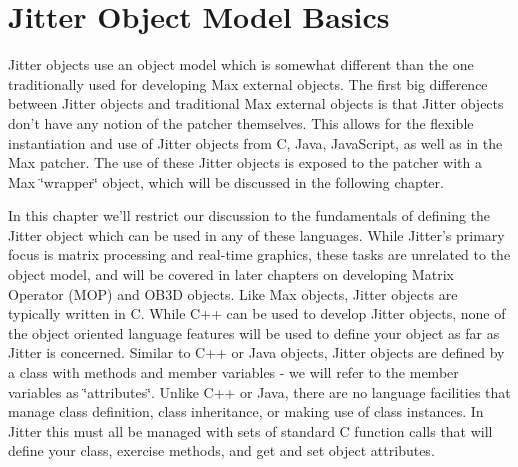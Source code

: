 \hypertarget{chapter_jit_objectmodel_chapter_jit_objectmodel_basics}{}\section{Jitter Object Model Basics}\label{chapter_jit_objectmodel_chapter_jit_objectmodel_basics}
Jitter objects use an object model which is somewhat different than the one traditionally used for developing Max external objects. The first big difference between Jitter objects and traditional Max external objects is that Jitter objects don't have any notion of the patcher themselves. This allows for the flexible instantiation and use of Jitter objects from C, Java, JavaScript, as well as in the Max patcher. The use of these Jitter objects is exposed to the patcher with a Max \char`\"{}wrapper\char`\"{} object, which will be discussed in the following chapter.

In this chapter we'll restrict our discussion to the fundamentals of defining the Jitter object which can be used in any of these languages. While Jitter's primary focus is matrix processing and real-\/time graphics, these tasks are unrelated to the object model, and will be covered in later chapters on developing Matrix Operator (MOP) and OB3D objects. Like Max objects, Jitter objects are typically written in C. While C++ can be used to develop Jitter objects, none of the object oriented language features will be used to define your object as far as Jitter is concerned. Similar to C++ or Java objects, Jitter objects are defined by a class with methods and member variables -\/ we will refer to the member variables as \char`\"{}attributes\char`\"{}. Unlike C++ or Java, there are no language facilities that manage class definition, class inheritance, or making use of class instances. In Jitter this must all be managed with sets of standard C function calls that will define your class, exercise methods, and get and set object attributes.

